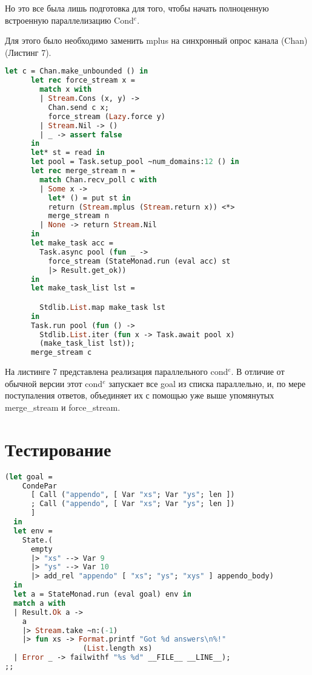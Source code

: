Но это все была лишь подготовка для того, чтобы начать полноценную встроенную параллелизацию Cond$^e$. 

Для этого было необходимо заменить mplus на синхронный опрос канала (Chan)(Листинг 7).

\begin{lstlisting}[caption=\textbf{Параллельная реализация Cond$^e$}, language=OCaml, frame=single]
  let c = Chan.make_unbounded () in
      let rec force_stream x =
        match x with
        | Stream.Cons (x, y) ->
          Chan.send c x;
          force_stream (Lazy.force y)
        | Stream.Nil -> ()
        | _ -> assert false
      in
      let* st = read in
      let pool = Task.setup_pool ~num_domains:12 () in
      let rec merge_stream n =
        match Chan.recv_poll c with
        | Some x ->
          let* () = put st in
          return (Stream.mplus (Stream.return x)) <*> 
          merge_stream n
        | None -> return Stream.Nil
      in
      let make_task acc =
        Task.async pool (fun _ ->
          force_stream (StateMonad.run (eval acc) st 
          |> Result.get_ok))
      in
      let make_task_list lst =

        Stdlib.List.map make_task lst
      in
      Task.run pool (fun () ->
        Stdlib.List.iter (fun x -> Task.await pool x) 
        (make_task_list lst));
      merge_stream c
\end{lstlisting}

На листинге 7 представлена реализация параллельного cond$^e$. В отличие от обычной версии этот cond$^e$ запускает все goal из списка параллельно, и, по мере поступаления ответов, объединяет их с помощью уже выше упомянутых merge\_stream и force\_stream. 

\section{Тестирование}

\begin{lstlisting}[caption=\textbf{Запуск двух параллельных append$^o$ (на параллельном и на обычном cond$^e$)}, language=OCaml, frame=single]
  (let goal =
    CondePar
      [ Call ("appendo", [ Var "xs"; Var "ys"; len ])
      ; Call ("appendo", [ Var "xs"; Var "ys"; len ])
      ]
  in
  let env =
    State.(
      empty
      |> "xs" --> Var 9
      |> "ys" --> Var 10
      |> add_rel "appendo" [ "xs"; "ys"; "xys" ] appendo_body)
  in
  let a = StateMonad.run (eval goal) env in
  match a with
  | Result.Ok a ->
    a
    |> Stream.take ~n:(-1)
    |> fun xs -> Format.printf "Got %d answers\n%!" 
                  (List.length xs)
  | Error _ -> failwithf "%s %d" __FILE__ __LINE__);
;;
\end{lstlisting}

